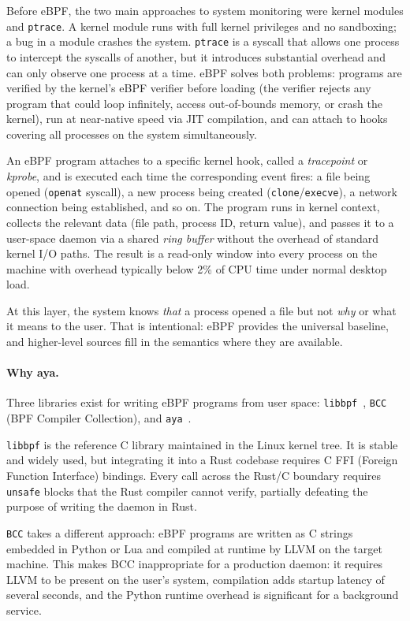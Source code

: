 Before eBPF, the two main approaches to system monitoring were kernel modules
and \texttt{ptrace}. A kernel module runs with full kernel privileges and no
sandboxing; a bug in a module crashes the system. \texttt{ptrace} is a syscall
that allows one process to intercept the syscalls of another, but it introduces
substantial overhead and can only observe one process at a time. eBPF solves
both problems: programs are verified by the kernel's eBPF verifier before
loading (the verifier rejects any program that could loop infinitely, access
out-of-bounds memory, or crash the kernel), run at near-native speed via JIT
compilation, and can attach to hooks covering all processes on the system
simultaneously.

An eBPF program attaches to a specific kernel hook, called a \emph{tracepoint}
or \emph{kprobe}, and is executed each time the corresponding event fires: a
file being opened (\texttt{openat} syscall), a new process being created
(\texttt{clone}/\texttt{execve}), a network connection being established, and
so on. The program runs in kernel context, collects the relevant data (file
path, process ID, return value), and passes it to a user-space daemon via a
shared \emph{ring buffer} without the overhead of standard kernel I/O paths.
The result is a read-only window into every process on the machine with overhead
typically below 2\% of CPU time under normal desktop load.

At this layer, the system knows \emph{that} a process opened a file but not
\emph{why} or what it means to the user. That is intentional: eBPF provides the
universal baseline, and higher-level sources fill in the semantics where they
are available.

\paragraph{Why aya.}
Three libraries exist for writing eBPF programs from user space:
\texttt{libbpf}~\cite{libbpf}, \texttt{BCC} (BPF Compiler Collection), and
\texttt{aya}~\cite{aya}.

\texttt{libbpf} is the reference C library maintained in the Linux kernel tree.
It is stable and widely used, but integrating it into a Rust codebase requires
C FFI (Foreign Function Interface) bindings. Every call across the Rust/C
boundary requires \texttt{unsafe} blocks that the Rust compiler cannot verify,
partially defeating the purpose of writing the daemon in Rust.

\texttt{BCC} takes a different approach: eBPF programs are written as C strings
embedded in Python or Lua and compiled at runtime by LLVM on the target machine.
This makes BCC inappropriate for a production daemon: it requires LLVM to be
present on the user's system, compilation adds startup latency of several
seconds, and the Python runtime overhead is significant for a background service.

